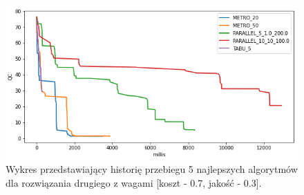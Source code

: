 \begin{figure}[ht]{}
	\centering
	\includegraphics[scale=0.85]{images/solution_2_cqp_2.png}
	\caption {
		 Wykres przedstawiający historię przebiegu 5 najlepszych algorytmów dla rozwiązania drugiego z wagami [koszt - 0.7, jakość - 0.3]. 
	}
	\label{fig:sol-2-w-2}
\end{figure}

